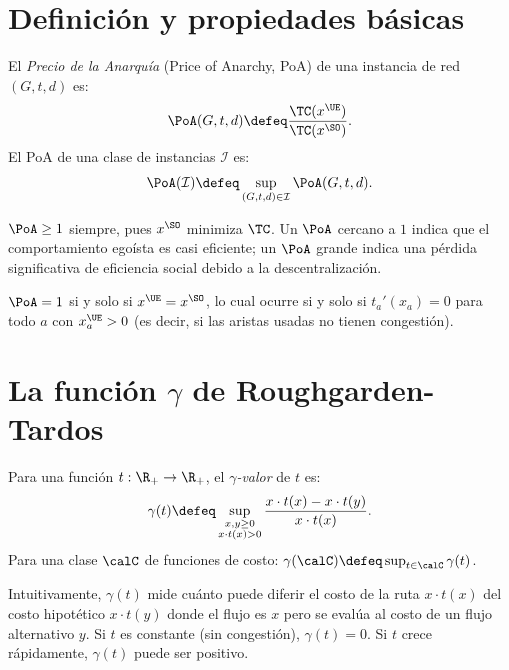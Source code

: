 
\section{Definición y propiedades básicas}


\begin{definition}\label{def:poa}
El \emph{Precio de la Anarquía} (Price of Anarchy, PoA) de una instancia de red $(G, t, d)$ es:
\[
\PoA(G, t, d) \defeq \frac{\TC(x^{\UE})}{\TC(x^{\SO})}.
\]
El PoA de una clase de instancias $\mathcal{I}$ es:
\[
\PoA(\mathcal{I}) \defeq \sup_{(G,t,d) \in \mathcal{I}} \PoA(G,t,d).
\]
\end{definition}

\begin{remark}
$\PoA \geq 1$ siempre, pues $x^{\SO}$ minimiza $\TC$. Un $\PoA$ cercano a $1$ indica que el comportamiento egoísta es casi eficiente; un $\PoA$ grande indica una pérdida significativa de eficiencia social debido a la descentralización.
\end{remark}

\begin{proposition}
$\PoA = 1$ si y solo si $x^{\UE} = x^{\SO}$, lo cual ocurre si y solo si $t_a'(x_a) = 0$ para todo $a$ con $x_a^{\UE} > 0$ (es decir, si las aristas usadas no tienen congestión).
\end{proposition}

\section{La función $\gamma$ de Roughgarden-Tardos}

\begin{definition}\label{def:gamma}
Para una función $t : \R_+ \to \R_+$, el \emph{$\gamma$-valor} de $t$ es:
\[
\gamma(t) \defeq \sup_{\substack{x, y \geq 0 \\ x \cdot t(x) > 0}} \frac{x \cdot t(x) - x \cdot t(y)}{x \cdot t(x)}.
\]
Para una clase $\calC$ de funciones de costo: $\gamma(\calC) \defeq \sup_{t \in \calC} \gamma(t)$.
\end{definition}

\begin{remark}
Intuitivamente, $\gamma(t)$ mide cuánto puede diferir el costo de la ruta $x \cdot t(x)$ del costo hipotético $x \cdot t(y)$ donde el flujo es $x$ pero se evalúa al costo de un flujo alternativo $y$. Si $t$ es constante (sin congestión), $\gamma(t) = 0$. Si $t$ crece rápidamente, $\gamma(t)$ puede ser positivo.
\end{remark}

